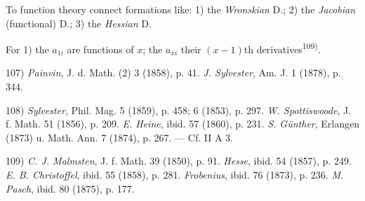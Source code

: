 To function theory connect formations like: 1) the \textit{Wronskian} D.; 2) the \textit{Jacobian} (functional) D.; 3) the \textit{Hessian} D. 

For 1) the $a_{1i}$ are functions of $x$; the $a_{xi}$ their $(x-1)$th derivatives\textsuperscript{109)}.

\vspace{-0.1cm}
\leftline{\rule{2in}{0.4pt}}
\vspace{0.1cm}
{
\footnotesize
107) \textit{Painvin}, J. d. Math. (2) 3 (1858), p. 41. \textit{J. Sylvester}, Am. J. 1 (1878), p. 344.

108) \textit{Sylvester}, Phil. Mag. 5 (1859), p. 458; 6 (1853), p. 297. \textit{W. Spottiswoode}, J. f. Math. 51 (1856), p. 209. \textit{E. Heine}, ibid. 57 (1860), p. 231. \textit{S. Günther}, Erlangen (1873) u. Math. Ann. 7 (1874), p. 267. — Cf. II A 3.

109) \textit{C. J. Malmsten}, J. f. Math. 39 (1850), p. 91. \textit{Hesse}, ibid. 54 (1857), p. 249. \textit{E. B. Christoffel}, ibid. 55 (1858), p. 281. \textit{Frobenius}, ibid. 76 (1873), p. 236. \textit{M. Pasch}, ibid. 80 (1875), p. 177.

}
